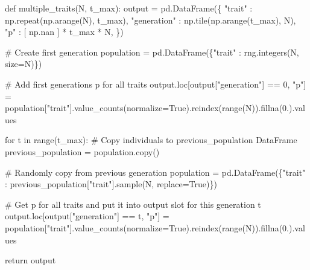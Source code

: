 \documentclass[
  a4paperpaper,
  ,captions=tableheading
]{scrbook}
\newenvironment{Shaded}{\begin{snugshade}}{\end{snugshade}}
\newcommand{\BuiltInTok}[1]{\textcolor[rgb]{0.00,0.23,0.31}{#1}}
\newcommand{\CommentTok}[1]{\textcolor[rgb]{0.37,0.37,0.37}{#1}}
\newcommand{\ControlFlowTok}[1]{\textcolor[rgb]{0.00,0.23,0.31}{#1}}
\newcommand{\DecValTok}[1]{\textcolor[rgb]{0.68,0.00,0.00}{#1}}
\newcommand{\FloatTok}[1]{\textcolor[rgb]{0.68,0.00,0.00}{#1}}
\newcommand{\KeywordTok}[1]{\textcolor[rgb]{0.00,0.23,0.31}{#1}}
\newcommand{\NormalTok}[1]{\textcolor[rgb]{0.00,0.23,0.31}{#1}}
\newcommand{\OperatorTok}[1]{\textcolor[rgb]{0.37,0.37,0.37}{#1}}
\newcommand{\StringTok}[1]{\textcolor[rgb]{0.13,0.47,0.30}{#1}}
\newcommand{\VariableTok}[1]{\textcolor[rgb]{0.07,0.07,0.07}{#1}}
\begin{document}
\begin{Shaded}
\begin{Highlighting}[]
\KeywordTok{def}\NormalTok{ multiple\_traits(N, t\_max):}
\NormalTok{    output }\OperatorTok{=}\NormalTok{ pd.DataFrame(\{}
        \StringTok{"trait"}\NormalTok{ : np.repeat(np.arange(N), t\_max),}
        \StringTok{"generation"}\NormalTok{ : np.tile(np.arange(t\_max), N),}
        \StringTok{"p"}\NormalTok{ : [ np.nan ] }\OperatorTok{*}\NormalTok{ t\_max }\OperatorTok{*}\NormalTok{ N,}
\NormalTok{    \})}

    \CommentTok{\# Create first generation }
\NormalTok{    population }\OperatorTok{=}\NormalTok{ pd.DataFrame(\{}\StringTok{"trait"}\NormalTok{ : rng.integers(N, size}\OperatorTok{=}\NormalTok{N)\})}

    \CommentTok{\# Add first generation\textquotesingle{}s p for all traits}
\NormalTok{    output.loc[output[}\StringTok{"generation"}\NormalTok{] }\OperatorTok{==} \DecValTok{0}\NormalTok{, }\StringTok{"p"}\NormalTok{] }\OperatorTok{=}\NormalTok{ population[}\StringTok{"trait"}\NormalTok{].value\_counts(normalize}\OperatorTok{=}\VariableTok{True}\NormalTok{).reindex(}\BuiltInTok{range}\NormalTok{(N)).fillna(}\FloatTok{0.}\NormalTok{).values}

    \ControlFlowTok{for}\NormalTok{ t }\KeywordTok{in} \BuiltInTok{range}\NormalTok{(t\_max):}
        \CommentTok{\# Copy individuals to previous\_population DataFrame}
\NormalTok{        previous\_population }\OperatorTok{=}\NormalTok{ population.copy()}

        \CommentTok{\# Randomly copy from previous generation}
\NormalTok{        population }\OperatorTok{=}\NormalTok{ pd.DataFrame(\{}\StringTok{"trait"}\NormalTok{ : previous\_population[}\StringTok{"trait"}\NormalTok{].sample(N, replace}\OperatorTok{=}\VariableTok{True}\NormalTok{)\})}

        \CommentTok{\# Get p for all traits and put it into output slot for this generation t}
\NormalTok{        output.loc[output[}\StringTok{"generation"}\NormalTok{] }\OperatorTok{==}\NormalTok{ t, }\StringTok{"p"}\NormalTok{] }\OperatorTok{=}\NormalTok{ population[}\StringTok{"trait"}\NormalTok{].value\_counts(normalize}\OperatorTok{=}\VariableTok{True}\NormalTok{).reindex(}\BuiltInTok{range}\NormalTok{(N)).fillna(}\FloatTok{0.}\NormalTok{).values}

    \ControlFlowTok{return}\NormalTok{ output}
\end{Highlighting}
\end{Shaded}
\end{document}
